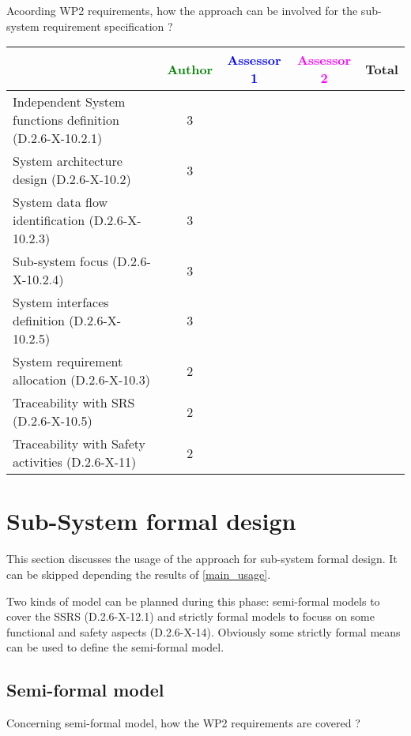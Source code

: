 Acoording WP2 requirements, how the approach can be involved for the sub-system requirement specification ?

\begin{tabular}{|l | c | c | c | c|}
\hline
& \textcolor{green}{Author} & \textcolor{blue}{Assessor 1} & \textcolor{magenta}{Assessor 2} & Total \\
\hline
Independent System functions definition (D.2.6-X-10.2.1)  & 3 & & &  \\
\hline 
System architecture design (D.2.6-X-10.2) & 3 & & &  \\
\hline
System data flow identification (D.2.6-X-10.2.3)  & 3 & & &  \\
\hline
Sub-system focus (D.2.6-X-10.2.4)  & 3 & & &  \\
\hline
System interfaces definition (D.2.6-X-10.2.5)  & 3 & & &  \\
\hline
System requirement allocation (D.2.6-X-10.3)  & 2 & & &  \\
\hline
Traceability with SRS (D.2.6-X-10.5)  & 2 & & &  \\
\hline
Traceability with Safety activities (D.2.6-X-11)  & 2 & & &  \\
\hline
\end{tabular}



\section{Sub-System formal design}
This section discusses the usage of the approach for sub-system formal design.
It can be skipped depending the results of \ref{main_usage}.

Two kinds of model can be planned during this phase: semi-formal models to  cover the SSRS (D.2.6-X-12.1) and strictly formal  models to  focuss on some functional and safety aspects (D.2.6-X-14).  Obviously some strictly  formal means can be used to define the semi-formal  model.

\subsection{Semi-formal model}

Concerning semi-formal model, how the WP2 requirements are covered ?

